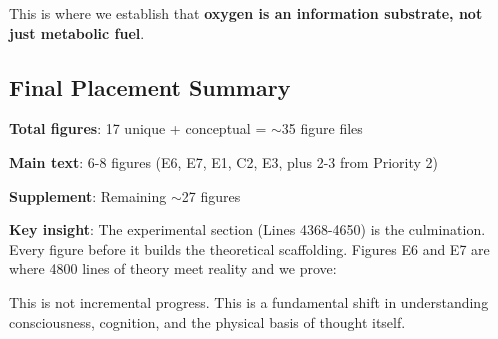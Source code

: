 \documentclass[11pt]{article}
\begin{document}
This is where we establish that \textbf{oxygen is an information substrate, not just metabolic fuel}.

\subsection{Final Placement Summary}

\textbf{Total figures}: 17 unique + conceptual = $\sim$35 figure files

\textbf{Main text}: 6-8 figures (E6, E7, E1, C2, E3, plus 2-3 from Priority 2)

\textbf{Supplement}: Remaining $\sim$27 figures

\textbf{Key insight}: The experimental section (Lines 4368-4650) is the culmination. Every figure before it builds the theoretical scaffolding. Figures E6 and E7 are where 4800 lines of theory meet reality and we prove:

\begin{center}
\end{center}

This is not incremental progress. This is a fundamental shift in understanding consciousness, cognition, and the physical basis of thought itself.
\end{document}
